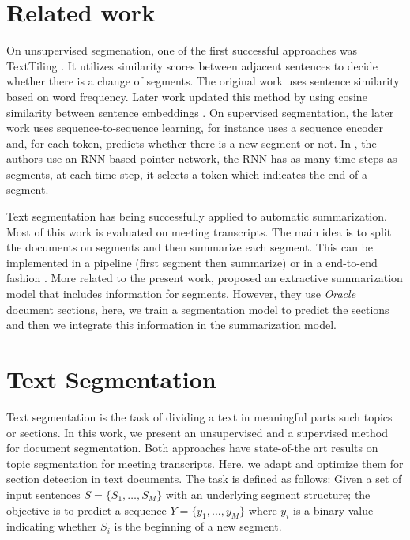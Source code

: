 \documentclass[sigconf]{acmart}
\begin{document}
\section{Related work}\label{sec:bck}


On unsupervised segmenation, one of the first successful approaches was TextTiling \cite{hearst-1997-text}. It utilizes similarity scores between adjacent sentences to decide whether there is a change of segments. The original work uses sentence similarity based on word frequency. Later work updated this method by using cosine similarity between sentence embeddings \cite{xu2021topicaware, solbiati2021unsupervised}. On supervised segmentation, the later work uses sequence-to-sequence learning, for instance \cite{liu-etal-2022-end} uses a sequence encoder and, for each token, predicts whether there is a new segment or not. In \cite{ijcai2018-579}, the authors use an RNN based pointer-network, the RNN has as many time-steps as segments, at each time step, it selects a token which indicates the end of a segment. 

Text segmentation has being successfully applied to automatic summarization. Most of this work is evaluated on meeting transcripts. The main idea is to split the documents on segments and then summarize each segment. This can be implemented in a pipeline (first segment then summarize) or in a end-to-end fashion \cite{liu-etal-2022-end, liu2019topic}. More related to the present work, \cite{ruan-etal-2022-histruct} proposed an extractive summarization model that includes information for segments. However, they use \emph{Oracle} document sections, here, we train a segmentation model to predict the sections and then we integrate this information in the summarization model. 

\section{Text Segmentation}\label{sec:seg}
Text segmentation is the task of dividing a text in meaningful parts such topics or sections. In this work, we present an unsupervised and a supervised method for document segmentation. Both approaches have state-of-the art results on topic segmentation for meeting transcripts. Here, we adapt and optimize them for section detection in text documents. 
The task is defined as follows: Given a set of input sentences $S = \{S_1, …, S_M\}$ with an underlying segment structure; the objective is to predict a sequence $Y = \{y_1, …, y_M\}$ where $y_i$ is a binary value indicating whether $S_i$ is the beginning of a new segment. 
\end{document}
